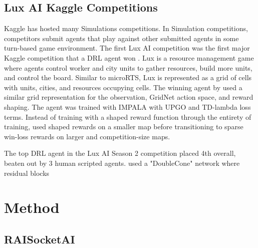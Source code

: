 \documentclass{article}
\begin{document}
\subsection{Lux AI Kaggle Competitions}
Kaggle has hosted many Simulations competitions. In Simulation competitions, competitors
submit agents that play against other submitted agents in some turn-based game
environment. The first Lux AI competition was the first major Kaggle competition that a
DRL agent won \citep{lux-ai-2021}. Lux is a resource management game where agents
control worker and city units to gather resources, build more units, and control the
board. Similar to microRTS, Lux is represented as a grid of cells with units, cities,
and resources occupying cells. The winning agent by \citet{lux-ai-2021-winner} used a
similar grid representation for the observation, GridNet action space, and reward
shaping. The agent was trained with IMPALA with UPGO and TD-lambda loss terms. Instead
of training with a shaped reward function through the entirety of training, \citet{lux-ai-2021-winner}
used shaped rewards on a smaller map before transitioning to sparse win-loss rewards on
larger and competition-size maps.

The top DRL agent in the Lux AI Season 2 competition placed 4th overall, beaten out by 3
human scripted agents. \citet{Ferdinand2021doublecone} used a "DoubleCone" network where
residual blocks

\section{Method}
\subsection{RAISocketAI}



\end{document}
